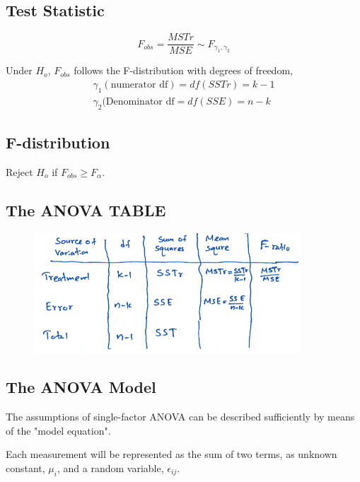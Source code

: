 \documentclass{article}
\begin{document}
            \subsection*{Test Statistic}
            \begin{equation*}
                F_{obs} = \frac{MSTr}{MSE} \sim F_{\gamma_{1}, \gamma_{2}}
            \end{equation*}

            Under $H_{o}$, $F_{obs}$ follows the F-distribution with degrees of freedom,
            \begin{align*}
                \gamma_{1}(\text{numerator df}) = df(SSTr) = k-1\\
                \gamma_{2}(\text{Denominator df} = df(SSE) = n-k
            \end{align*}
            \subsection*{F-distribution}
            Reject $H_{o}$ if $F_{obs} \geq F_{\alpha}$.

            \subsection*{The ANOVA TABLE}
            \begin{figure}[H]
                \centering
                \includegraphics[width=10cm]{figures/anova_table2.PNG}
                \label{fig:anova_table2}
            \end{figure}
          
            \subsection*{The ANOVA Model}
            The assumptions of single-factor ANOVA can be described sufficiently 
            by means of the "model equation". \par
            Each measurement will be represented as the sum of 
            two terms, as unknown constant, $\mu_{i}$, and a random variable, $\epsilon_{ij}$.
\end{document}
